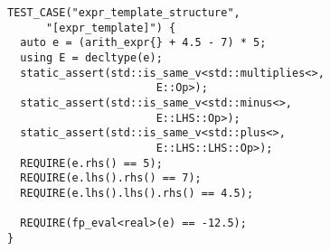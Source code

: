\begin{lstlisting}[basicstyle=\small\ttfamily]
TEST_CASE("expr_template_structure",
	  "[expr_template]") {
  auto e = (arith_expr{} + 4.5 - 7) * 5;
  using E = decltype(e);
  static_assert(std::is_same_v<std::multiplies<>,
		               E::Op>);
  static_assert(std::is_same_v<std::minus<>,
		               E::LHS::Op>);
  static_assert(std::is_same_v<std::plus<>,
		               E::LHS::LHS::Op>);
  REQUIRE(e.rhs() == 5);
  REQUIRE(e.lhs().rhs() == 7);
  REQUIRE(e.lhs().lhs().rhs() == 4.5);

  REQUIRE(fp_eval<real>(e) == -12.5);
}
\end{lstlisting}
